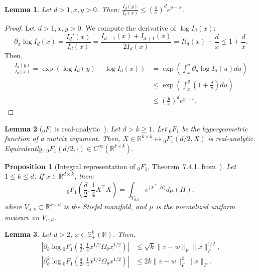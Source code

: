 \documentclass{article}
\theoremstyle{plain}
\newtheorem{proposition}{Proposition}[section]
\newtheorem{lemma}{Lemma}[section]
\theoremstyle{definition}
\theoremstyle{remark}
\begin{document}
\begin{lemma}
\label{lem:bessel-ratio-bound}
    Let $d > 1, x,y > 0$. Then: $\frac{I_d(y)}{I_d(x)} \leq \left(\frac{y}{x}\right)^d e^{y-x}$.
\end{lemma}
\begin{proof}
Let $d > 1, x,y > 0$. We compute the derivative of $\log I_d(x)$:
\[\partial_x \log I_d(x) = \frac{I_d'(x)}{I_d(x)} =  \frac{I_{d-1}(x) + I_{d+1}(x)} {2I_d(x)} = R_d(x) + \frac{d}{x} \leq 1 + \frac{d}{x}.\]
Then,
     \begin{align*}
        \frac{I_d(y)}{I_d(x)}= \exp(\log I_d(y) - \log I_d(x)) &= \exp\left( \int_{x}^y \partial_u \log I_d(u) du\right)\\
        &\leq \exp\left( \int_{x}^y \left(1 + \frac{d}{u}\right) du\right)\\
        &\leq \left(\frac{y}{x}\right)^d e^{y-x}.
    \end{align*}
\end{proof}


\begin{lemma}[${}_0F_1$ is real-analytic~\citep{Gross1987}]
\label{lem:hypergeometric-regularity}
    Let $d > k \geq 1$. Let ${}_0F_1$ be the hypergeometric function of a matrix argument. Then, $X \in \mathbb{R}^{k \times k} \mapsto {}_0F_1(d/2,X)$ is real-analytic. Equivalently, ${}_0F_1(d/2,\cdot) \in C^\infty(\mathbb{R}^{k\times k})$.
\end{lemma}

\begin{proposition}[Integral representation of ${}_0F_1$, Theorem~7.4.1. from~\citet{Muirhead2009}]
\label{prop:integral-representation}
    Let $1 \leq k \leq d$. If $x \in \mathbb{R}^{d \times k}$, then:
    \[{}_0F_1\left(\frac{d}{2}, \frac{1}{4} X^\top X\right) = \int_{V_{d,k}} e^{\langle X^\top, H\rangle} d\mu(H),\]
    where $V_{d,k} \subset \mathbb{R}^{k \times d}$ is the Stiefel manifold, and $\mu$ is the normalized uniform measure on $V_{n,d}$.
\end{proposition}

\begin{lemma}
\label{lem:scaling-log-hypergeometric}
    Let $d > 2$, $x \in \mathbb{S}_+^k(\mathbb{R})$. Then,
    \begin{align*}
         \left|\partial_\theta \log {}_0F_1\left(\frac{d}{2}, \frac{1}{4}x^{1/2} \Omega_\theta x^{1/2}\right)\right| &\leq \sqrt{k}\|v-w\|_{F} \|x\|_F^{1/2},\\
         \left|\partial_\theta^2 \log {}_0F_1\left(\frac{d}{2}, \frac{1}{4}x^{1/2} \Omega_\theta x^{1/2}\right)\right| &\leq 2k \|v-w\|_F^2 \|x\|_F.
    \end{align*}
\end{lemma}
\end{document}
